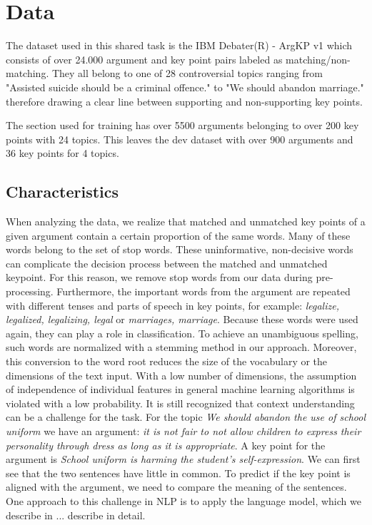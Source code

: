 \section{Data}\label{data}

The dataset used in this shared task is the IBM Debater(R) - ArgKP v1 \cite{Bar-HaimEFKLS2020} which consists of over 
24.000 argument and key point pairs labeled as matching/non-matching.
They all belong to one of 28 controversial topics ranging from "Assisted suicide should be a criminal offence." to 
"We should abandon marriage." therefore drawing a clear line between supporting and non-supporting key points.

The section used for training has over 5500 arguments belonging to over 200 key points with 24 topics. This leaves the 
dev dataset with over 900 arguments and 36 key points for 4 topics.

\subsection{Characteristics}

When analyzing the data, we realize that matched and unmatched key points of a given argument contain a certain proportion of the same words. Many of these words belong to the set of stop words. These uninformative, non-decisive words can complicate the decision process between the matched and unmatched keypoint. For this reason, we remove stop words from our data during pre-processing. Furthermore, the important words from the argument are repeated with different tenses and parts of speech in key points, for example: \textit{legalize, legalized, legalizing, legal} or \textit{marriages, marriage}. Because these words were used again, they can play a role in classification. To achieve an unambiguous spelling, such words are normalized with a stemming method in our approach. Moreover, this conversion to the word root reduces the size of the vocabulary or the dimensions of the text input. With a low number of dimensions, the assumption of independence of individual features in general machine learning algorithms is violated with a low probability. It is still recognized that context understanding can be a challenge for the task. For the topic \textit{We should abandon the use of school uniform} we have an argument: \textit{it is not fair to not allow children to express their personality through dress as long as it is appropriate}. A key point for the argument is \textit{School uniform is harming the student's self-expression}. We can first see that the two sentences have little in common. To predict if the key point is aligned with the argument, we need to compare the meaning of the sentences. One approach to this challenge in NLP is to apply the language model, which we describe in ... describe in detail.

